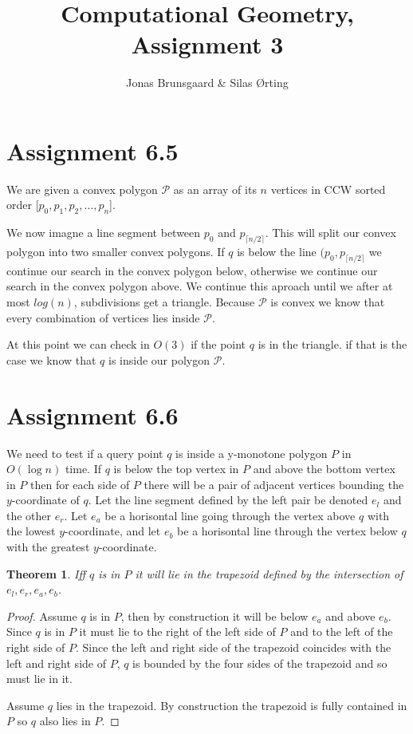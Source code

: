 \documentclass[10pt,a4paper,final,oneside,openany,article,oldfontcommands]{memoir}
\title{Computational Geometry, Assignment 3}
\author{
    Jonas Brunsgaard \& Silas Ørting
}
\newtheorem{pinQ}{Theorem}
\begin{document}
\maketitle

\chapter*{Assignment 6.5}
We are given a convex polygon $\mathcal{P}$ as an array of its $n$ vertices in
CCW sorted order [$p_0, p_1,p_2, \dots, p_n$].

We now imagne a line segment between $p_0$ and $p_{\lceil n/2 \rceil}$. This
will split our convex polygon into two smaller convex polygons. If $q$ is
below the line $(p_0, p_{\lceil n/2 \rceil}$ we continue our search in the
convex polygon below, otherwise we continue our search in the convex polygon
above. We continue this aproach until we after at most $log(n)$, subdivisions
get a triangle. Because $\mathcal{P}$ is convex we know that every combination
of vertices lies inside $\mathcal{P}$.

At this point we can check in $O(3)$ if the point $q$ is in the triangle. if
that is the case we know that $q$ is inside our polygon $\mathcal{P}$.


\chapter*{Assignment 6.6}
We need to test if a query point $q$ is inside a y-monotone polygon $P$ in
$O(\log n)$ time. If $q$ is below the top vertex in $P$ and above the bottom
vertex in $P$ then for each side of $P$ there will be a pair of adjacent
vertices bounding the $y$-coordinate of $q$. Let the line segment defined by
the left pair be denoted $e_l$ and the other $e_r$. Let $e_a$ be a horisontal
line going through the vertex above $q$ with the lowest $y$-coordinate, and
let $e_b$ be a horisontal line through the vertex below $q$ with the greatest
$y$-coordinate.

\begin{pinQ}
  Iff $q$ is in $P$ it will lie in the trapezoid defined by the intersection of $e_l, e_r, e_a, e_b$.  
\end{pinQ}

\begin{proof}
  Assume $q$ is in $P$, then by construction it will be below $e_a$ and above $e_b$. Since $q$ is in $P$ it must lie to the right of the left side of $P$ and to the left of the right side of $P$. Since the left and right side of the trapezoid coincides with the left and right side of $P$, $q$ is bounded by the four sides of the trapezoid and so must lie in it.
  
  Assume $q$ lies in the trapezoid. By construction the trapezoid is fully contained in $P$ so $q$ also lies in $P$.
\end{proof}
\end{document}
